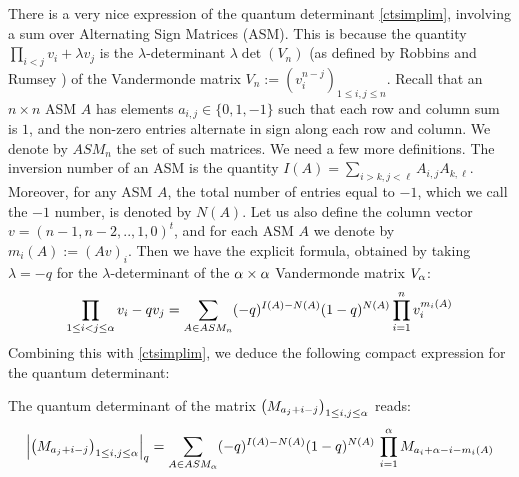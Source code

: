 There is a very nice expression of the quantum determinant \eqref{ctsimplim}, involving a sum 
over Alternating Sign Matrices (ASM). 
This is because the quantity $\prod_{i<j}v_i+\lambda v_j$ is the $\lambda$-determinant $\lambda\!\det( V_n)$
(as defined by Robbins and Rumsey \cite{RR})
of the Vandermonde matrix $V_n:=(v_i^{n-j})_{1\leq i,j\leq n}$.
Recall that an $n\times n$ ASM $A$ has elements $a_{i,j}\in \{0,1,-1\}$
such that each row and column sum is $1$, and the non-zero entries alternate in sign along each row and column.
We denote by $ASM_n$ the set of such matrices.
We need a few more definitions.
The inversion number of an ASM is the quantity $I(A)=\sum_{i>k,j<\ell} A_{i,j}A_{k,\ell}$. Moreover, for any ASM $A$,
the total number of entries equal to $-1$, which we call the $-1$ number, is denoted by $N(A)$. 
Let us also define the column vector $v=(n-1,n-2,..,1,0)^t$,
and for each ASM $A$ we denote by $m_i(A):= (Av)_i$.
Then we have the explicit formula, obtained by taking $\lambda =-q$ for the $\lambda$-determinant of the 
${\alpha}\times {\alpha}$ Vandermonde matrix $V_{\alpha}$:
$$\prod_{1\leq i<j\leq {\alpha}}v_i-q v_j=\sum_{A\in ASM_n} (-q)^{I(A)-N(A)} (1-q)^{N(A)} \prod_{i=1}^n v_i^{m_i(A)} $$
Combining this with \eqref{ctsimplim}, we deduce the following compact expression for the quantum determinant:

\begin{thm}\label{qdethm}
The quantum determinant of the matrix $\left( M_{a_j+i-j}\right)_{1\leq i,j\leq {\alpha}}$ reads:
\begin{equation}\label{ASMqdet}
\left\vert \left( M_{a_j+i-j}\right)_{1\leq i,j\leq {\alpha}} \right\vert_q=\sum_{A\in ASM_{\alpha}}
(-q)^{I(A)-N(A)}(1-q)^{N(A)} \, \prod_{i=1}^{\alpha} M_{ a_i+{\alpha}-i-m_i(A)}
\end{equation}
\end{thm}


